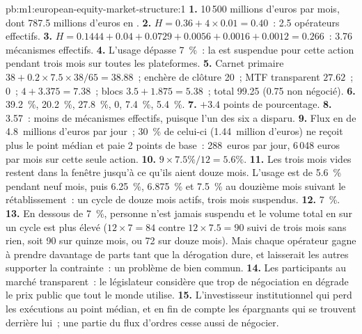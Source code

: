 \begin{solution}{pb:m1:european-equity-market-structure:1}
\textbf{1.} 10\,500 millions d'euros par mois, dont 787.5 millions d'euros en .
\textbf{2.} $H = 0.36 + 4\times0.01 = 0.40$~: 2.5 opérateurs effectifs.
\textbf{3.} $H = 0.1444 + 0.04 + 0.0729 + 0.0056 + 0.0016 + 0.0012 = 0.266$~:
3.76 mécanismes effectifs.
\textbf{4.} L'usage dépasse 7~\%~: la  est suspendue pour
cette action pendant trois mois sur toutes les plateformes.
\textbf{5.} Carnet primaire $38 + 0.2\times7.5\times38/65 = 38.88$~; enchère de
clôture 20~; MTF transparent $27.62$~;  0~;  $4 + 3.375 = 7.38$~; blocs
$3.5 + 1.875 = 5.38$~; total 99.25 (0.75 non négocié).
\textbf{6.} 39.2~\%, 20.2~\%, 27.8~\%, 0, 7.4~\%, 5.4~\%.
\textbf{7.} $+3.4$ points de pourcentage.
\textbf{8.} 3.57~: moins de mécanismes effectifs, puisque l'un des six a
disparu.
\textbf{9.} Flux en  de 4.8~millions d'euros par jour~; 30~\% de celui-ci (1.44~million d'euros)
ne reçoit plus le point médian et paie 2 points de base~: 288~euros par jour,
6\,048 euros par mois sur cette seule action.
\textbf{10.} $9 \times 7.5\%/12 = 5.6\%$.
\textbf{11.} Les trois mois vides restent dans la fenêtre jusqu'à ce qu'ils aient
douze mois. L'usage est de 5.6~\% pendant neuf mois, puis 6.25~\%, 6.875~\% et 7.5~\%
au douzième mois suivant le rétablissement~: un cycle de douze mois actifs, trois
mois suspendus.
\textbf{12.} 7~\%.
\textbf{13.} En dessous de 7~\%, personne n'est jamais suspendu et le volume total en 
sur un cycle est plus élevé ($12\times7 = 84$ contre $12\times7.5 = 90$ suivi
de trois mois sans rien, soit 90 sur quinze mois, ou 72 sur douze mois).
Mais chaque opérateur gagne à prendre davantage de parts tant que la dérogation dure, et
laisserait les autres supporter la contrainte~: un problème de bien commun.
\textbf{14.} Les participants au marché transparent~: le législateur considère que
trop de négociation en  dégrade le prix public que tout le monde utilise.
\textbf{15.} L'investisseur institutionnel qui perd les exécutions au point médian, et
en fin de compte les épargnants qui se trouvent derrière lui~; une partie du flux d'ordres cesse aussi de négocier.

\end{solution}

